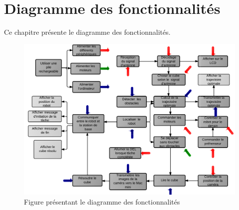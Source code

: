 


\chapter{Diagramme des fonctionnalités}
\label{s:diagfonct}
Ce chapitre présente le diagramme des fonctionnalités.

\begin{figure}[htbp]
\centering
\label{fig:DiagrammeDesFonctionnalitS}
\includegraphics[scale=0.275]{fig/DiagrammeDesFonctionnalitS.png}
\caption{Figure présentant le diagramme des fonctionnalités}
\end{figure}